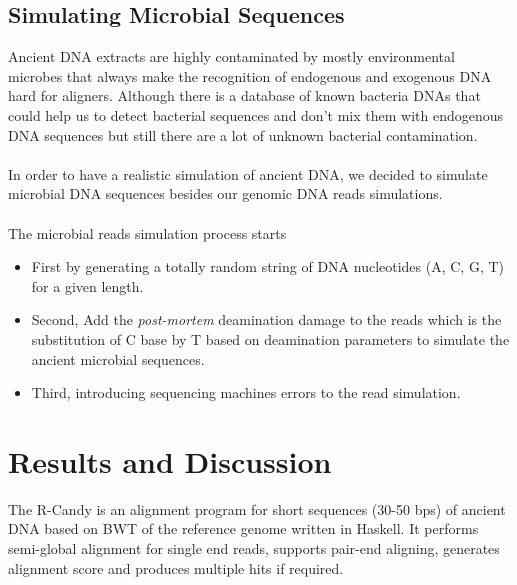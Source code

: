 \documentclass[11pt,a4paper]{report}
\begin{document}
\subsection{Simulating Microbial Sequences}

   

Ancient DNA extracts are highly contaminated by mostly environmental microbes that always make the recognition of endogenous and exogenous DNA hard for aligners.
Although there is a database of known bacteria DNAs that could help us to detect bacterial sequences and don't mix them with endogenous 
DNA sequences but still there are a lot of unknown bacterial contamination.
\\\\
In order to have a realistic simulation of ancient DNA, we decided to simulate microbial DNA sequences besides our genomic DNA reads simulations.
\\\\
The microbial reads simulation process starts

\begin{itemize}

 \item First by generating a totally random string of DNA nucleotides (A, C, G, T) for a given length.

 \item Second, Add the \emph{post-mortem} deamination damage to 
the reads which is the substitution of C base by T based on deamination parameters to simulate the ancient microbial sequences.


 \item Third, introducing sequencing machines errors 
 to the read simulation.

\end{itemize}



\section{Results and Discussion}


The R-Candy is an alignment program for 
short sequences (30-50 bps) of ancient DNA based on BWT of the reference genome written in Haskell. 
It performs semi-global alignment for single end reads, supports pair-end aligning, 
generates alignment score and produces multiple hits if required.
\end{document}
